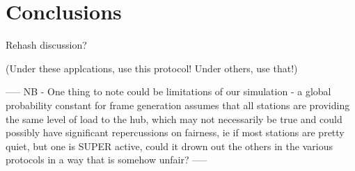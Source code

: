 \documentclass[twocolumn]{article}
\begin{document}

\section*{Conclusions}

Rehash discussion?

(Under these applcations, use this protocol! Under others, use that!)


-----
NB -
One thing to note could be limitations of our simulation - a global probability constant 
for frame generation assumes that all stations are providing the same level of load to 
the hub, which may not necessarily be true and could possibly have significant
repercussions on fairness, ie if most stations are pretty quiet, but one is SUPER active,
could it drown out the others in the various protocols in a way that is somehow unfair?
-----
\end{document}

